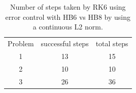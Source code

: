 \begin{table}[h]
\caption {Number of steps taken by RK6 using error control with HB6 vs HB8 by using a continuous L2 norm.} \label{tab:rk6_with_hb6_hb8_L2norm_nsteps}
\begin{center}
\begin{tabular}{ c c c } 
Problem & successful steps & total steps \\ 
1       & 13                         & 15 \\ 
2       & 10                         & 10 \\
3       & 26                         & 36 \\
\end{tabular}
\end{center}
\end{table}